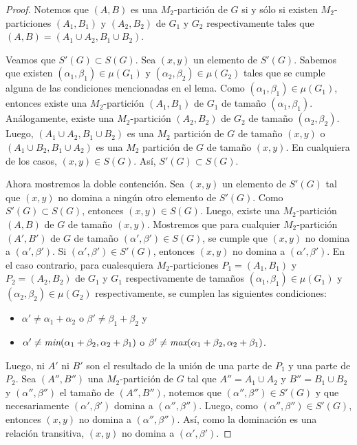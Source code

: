\begin{proof}
Notemos que $(A,B)$ es una $M_2$-partición de $G$ si y sólo si existen $M_2$-particiones $(A_1,B_1)$ y $(A_2,B_2)$ de $G_1$ y $G_2$ respectivamente tales que $(A,B)=(A_1\cup A_2, B_1 \cup B_2)$. 

Veamos que $S'(G)\subset S(G)$. Sea $(x,y)$ un elemento de $S'(G)$. Sabemos que existen $(\alpha_1,\beta_1)\in \mu(G_1)$ y $(\alpha_2,\beta_2)\in \mu(G_2)$ tales que se cumple alguna de las condiciones mencionadas en el lema. Como $(\alpha_1,\beta_1)\in \mu(G_1)$, entonces existe una $M_2$-partición $(A_1,B_1)$ de $G_1$ de tamaño $(\alpha_1, \beta_1)$. Análogamente, existe una $M_2$-partición $(A_2,B_2)$ de $G_2$ de tamaño $(\alpha_2, \beta_2)$. Luego, $(A_1\cup A_2, B_1 \cup B_2)$ es una $M_2$ partición de $G$ de tamaño $(x,y)$ o $(A_1\cup B_2, B_1 \cup A_2)$ es una $M_2$ partición de $G$ de tamaño $(x,y)$. En cualquiera de los casos, $(x,y)\in S(G)$. Así, $S'(G)\subset S(G)$.

Ahora mostremos la doble contención. Sea $(x,y)$ un elemento de $S'(G)$ tal que $(x,y)$ no domina a ningún otro elemento de $S'(G)$. Como $S'(G)\subset S(G)$, entonces $(x,y)\in S(G)$. Luego, existe una $M_2$-partición $(A,B)$ de $G$ de tamaño $(x,y)$. Mostremos que para cualquier $M_2$-partición $(A',B')$ de $G$ de tamaño $(\alpha',\beta')\in S(G)$, se cumple que $(x,y)$ no domina a $(\alpha',\beta')$. Si $(\alpha',\beta')\in S'(G)$, entonces $(x,y)$ no domina a $(\alpha',\beta')$. En el caso contrario, para cualesquiera $M_2$-particiones $P_1=(A_1,B_1)$ y $P_2=(A_2,B_2)$ de $G_1$ y $G_1$ respectivamente de tamaños $(\alpha_1,\beta_1)\in \mu(G_1)$ y $(\alpha_2,\beta_2)\in \mu(G_2)$ respectivamente, se cumplen las siguientes condiciones:
\begin{itemize}
    \item $\alpha' \neq \alpha_1+\alpha_2$ o $\beta' \neq \beta_1 + \beta_2$ y
    \item $\alpha' \neq \emph{min}(\alpha_1+\beta_2, \alpha_2+\beta_1)$ o  $\beta' \neq \emph{max}(\alpha_1+\beta_2, \alpha_2+\beta_1)$. 
\end{itemize}
Luego, ni $A'$ ni $B'$ son el resultado de la unión de una parte de $P_1$ y una parte de $P_2$. Sea $(A'',B'')$ una $M_2$-partición de $G$ tal que $A''=A_1\cup A_2$ y $B''=B_1\cup B_2$ y $(\alpha'', \beta'')$ el tamaño de $(A'',B'')$, notemos que $(\alpha'', \beta'')\in S'(G)$ y que necesariamente $(\alpha', \beta')$ domina a $(\alpha'', \beta'')$. Luego, como $(\alpha'', \beta'')\in S'(G)$, entonces $(x,y)$ no domina a $(\alpha'', \beta'')$. Así, como la dominación es una relación transitiva, $(x,y)$ no domina a $(\alpha', \beta')$.


\end{proof}
